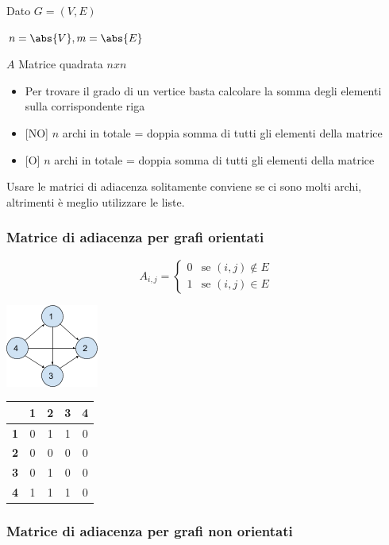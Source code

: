 \documentclass[tikz]{article}
\providecommand{\tightlist}{%
  \setlength{\itemsep}{0pt}\setlength{\parskip}{0pt}}
\begin{document}
{Dato $G=(V,E)$}

$n=\abs{V},m=\abs{E}$

{$A$ Matrice quadrata $n x n$ }

\begin{itemize}
\tightlist
\item
  {Per trovare il grado di un vertice basta calcolare la somma degli elementi sulla corrispondente riga}
\item
  {{[}NO{]} $n$ archi in totale = doppia somma di tutti gli elementi della matrice}
\item
  {{[}O{]} $n$ archi in totale = doppia somma di tutti gli elementi della matrice}
\end{itemize}

{Usare le matrici di adiacenza solitamente conviene se ci sono molti archi, altrimenti è meglio utilizzare le liste.}

\subsubsection{Matrice di adiacenza per grafi orientati}

\begin{equation}
A_{i,j} = 
\begin{cases}
0 & \mbox{se } (i,j) \notin E \\ 
1 & \mbox{se } (i,j) \in E
\end{cases}
\end{equation}

{\includegraphics{images/image529.png}}

\begin{tabular}{|c|c|c|c|c|}
\hline 
  & \textbf{1} & \textbf{2} & \textbf{3} & \textbf{4} \\ 
\hline 
\textbf{1} & 0 & 1 & 1 & 0 \\ 
\hline 
\textbf{2} & 0 & 0 & 0 & 0 \\ 
\hline 
\textbf{3} & 0 & 1 & 0 & 0 \\ 
\hline 
\textbf{4} & 1 & 1 & 1 & 0 \\ 
\hline 
\end{tabular} 

\subsubsection{Matrice di adiacenza per grafi non orientati}
\end{document}
